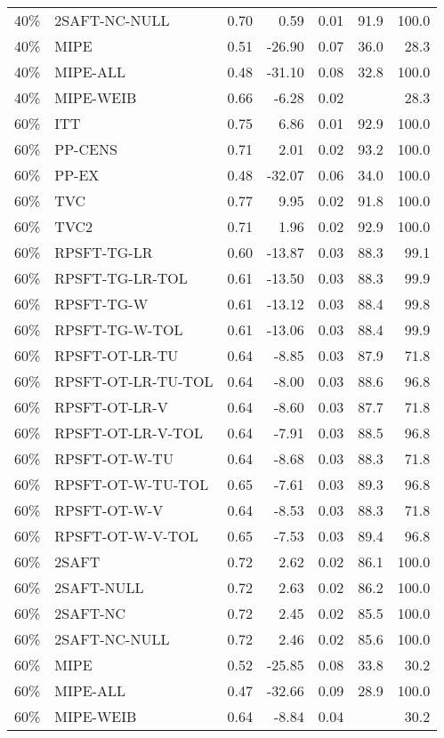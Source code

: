 \begin{table}[ht]
{\begin{tabular}{llrrrrr}
  40\% & 2SAFT-NC-NULL & 0.70 & 0.59 & 0.01 & 91.9 & 100.0 \\ 
  40\% & MIPE & 0.51 & -26.90 & 0.07 & 36.0 & 28.3 \\ 
  40\% & MIPE-ALL & 0.48 & -31.10 & 0.08 & 32.8 & 100.0 \\ 
  40\% & MIPE-WEIB & 0.66 & -6.28 & 0.02 &  & 28.3 \\ 
   \hline
60\% & ITT & 0.75 & 6.86 & 0.01 & 92.9 & 100.0 \\ 
  60\% & PP-CENS & 0.71 & 2.01 & 0.02 & 93.2 & 100.0 \\ 
  60\% & PP-EX & 0.48 & -32.07 & 0.06 & 34.0 & 100.0 \\ 
  60\% & TVC & 0.77 & 9.95 & 0.02 & 91.8 & 100.0 \\ 
  60\% & TVC2 & 0.71 & 1.96 & 0.02 & 92.9 & 100.0 \\ 
   \hline
60\% & RPSFT-TG-LR & 0.60 & -13.87 & 0.03 & 88.3 & 99.1 \\ 
  60\% & RPSFT-TG-LR-TOL & 0.61 & -13.50 & 0.03 & 88.3 & 99.9 \\ 
  60\% & RPSFT-TG-W & 0.61 & -13.12 & 0.03 & 88.4 & 99.8 \\ 
  60\% & RPSFT-TG-W-TOL & 0.61 & -13.06 & 0.03 & 88.4 & 99.9 \\ 
  60\% & RPSFT-OT-LR-TU & 0.64 & -8.85 & 0.03 & 87.9 & 71.8 \\ 
  60\% & RPSFT-OT-LR-TU-TOL & 0.64 & -8.00 & 0.03 & 88.6 & 96.8 \\ 
  60\% & RPSFT-OT-LR-V & 0.64 & -8.60 & 0.03 & 87.7 & 71.8 \\ 
  60\% & RPSFT-OT-LR-V-TOL & 0.64 & -7.91 & 0.03 & 88.5 & 96.8 \\ 
   \hline
60\% & RPSFT-OT-W-TU & 0.64 & -8.68 & 0.03 & 88.3 & 71.8 \\ 
  60\% & RPSFT-OT-W-TU-TOL & 0.65 & -7.61 & 0.03 & 89.3 & 96.8 \\ 
  60\% & RPSFT-OT-W-V & 0.64 & -8.53 & 0.03 & 88.3 & 71.8 \\ 
  60\% & RPSFT-OT-W-V-TOL & 0.65 & -7.53 & 0.03 & 89.4 & 96.8 \\ 
   \hline
60\% & 2SAFT & 0.72 & 2.62 & 0.02 & 86.1 & 100.0 \\ 
  60\% & 2SAFT-NULL & 0.72 & 2.63 & 0.02 & 86.2 & 100.0 \\ 
  60\% & 2SAFT-NC & 0.72 & 2.45 & 0.02 & 85.5 & 100.0 \\ 
  60\% & 2SAFT-NC-NULL & 0.72 & 2.46 & 0.02 & 85.6 & 100.0 \\ 
  60\% & MIPE & 0.52 & -25.85 & 0.08 & 33.8 & 30.2 \\ 
  60\% & MIPE-ALL & 0.47 & -32.66 & 0.09 & 28.9 & 100.0 \\ 
  60\% & MIPE-WEIB & 0.64 & -8.84 & 0.04 &  & 30.2 \\ 
   \hline
\end{tabular}
}
\end{table}
